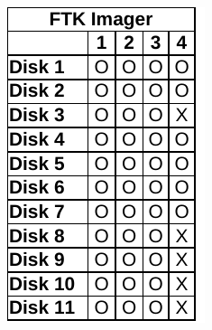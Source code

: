 \begin{paraphrase}
\begin{figure}
\begin{subfigure}[t]{0.17\linewidth}
        \includegraphics[width=\linewidth]{fig/ftk_results_fat.pdf}
    \end{subfigure}~~
    \begin{subfigure}[t]{0.17\linewidth}

\end{subfigure}
\end{figure}
\end{paraphrase}
